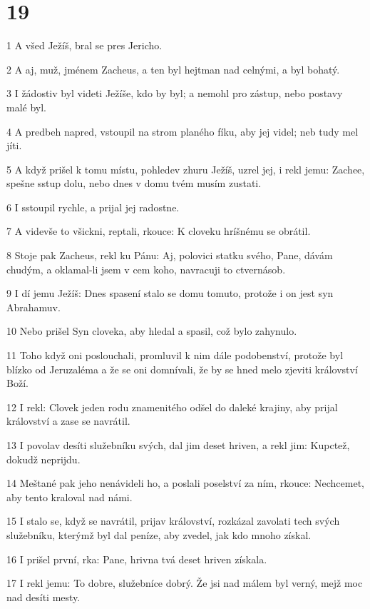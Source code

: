 \chapter{19}

\par 1 A všed Ježíš, bral se pres Jericho.
\par 2 A aj, muž, jménem Zacheus, a ten byl hejtman nad celnými, a byl bohatý.
\par 3 I žádostiv byl videti Ježíše, kdo by byl; a nemohl pro zástup, nebo postavy malé byl.
\par 4 A predbeh napred, vstoupil na strom planého fíku, aby jej videl; neb tudy mel jíti.
\par 5 A když prišel k tomu místu, pohledev zhuru Ježíš, uzrel jej, i rekl jemu: Zachee, spešne sstup dolu, nebo dnes v domu tvém musím zustati.
\par 6 I sstoupil rychle, a prijal jej radostne.
\par 7 A videvše to všickni, reptali, rkouce: K cloveku hríšnému se obrátil.
\par 8 Stoje pak Zacheus, rekl ku Pánu: Aj, polovici statku svého, Pane, dávám chudým, a oklamal-li jsem v cem koho, navracuji to ctvernásob.
\par 9 I dí jemu Ježíš: Dnes spasení stalo se domu tomuto, protože i on jest syn Abrahamuv.
\par 10 Nebo prišel Syn cloveka, aby hledal a spasil, což bylo zahynulo.
\par 11 Toho když oni poslouchali, promluvil k nim dále podobenství, protože byl blízko od Jeruzaléma a že se oni domnívali, že by se hned melo zjeviti království Boží.
\par 12 I rekl: Clovek jeden rodu znamenitého odšel do daleké krajiny, aby prijal království a zase se navrátil.
\par 13 I povolav desíti služebníku svých, dal jim deset hriven, a rekl jim: Kupctež, dokudž neprijdu.
\par 14 Meštané pak jeho nenávideli ho, a poslali poselství za ním, rkouce: Nechcemet, aby tento kraloval nad námi.
\par 15 I stalo se, když se navrátil, prijav království, rozkázal zavolati tech svých služebníku, kterýmž byl dal peníze, aby zvedel, jak kdo mnoho získal.
\par 16 I prišel první, rka: Pane, hrivna tvá deset hriven získala.
\par 17 I rekl jemu: To dobre, služebníce dobrý. Že jsi nad málem byl verný, mejž moc nad desíti mesty.
